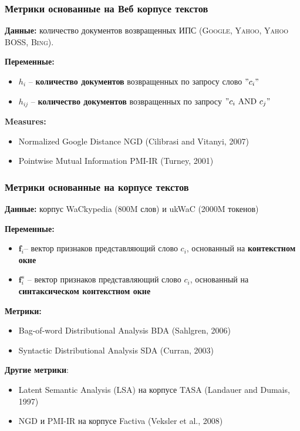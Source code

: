 \documentclass{beamer}
\begin{document}
\begin{frame}
\frametitle{Метрики основанные на Веб корпусе текстов }

\textbf{Данные:} количество документов возвращенных ИПС (\textsc{Google, Yahoo, Yahoo BOSS, Bing}).
	
 \textbf{Переменные:} 
\begin{itemize}
	\item $h_i$ -- \textbf{количество документов} возвращенных по запросу слово $"c_i"$ 
	\item $h_{ij}$ -- \textbf{количество документов} возвращенных по запросу $"c_i \text{ AND } c_j"$
\end{itemize}

\textbf{Measures:} 
\begin{itemize}
\item Normalized Google Distance NGD (Cilibrasi and Vitanyi, 2007)
\item Pointwise Mutual Information PMI-IR (Turney, 2001)
\end{itemize}
\end{frame}

\begin{frame}
\frametitle{Метрики основанные на корпусе текстов}


\textbf{Данные:} корпус WaCkypedia (800M слов) и ukWaC (2000M токенов) 
	
\textbf{Переменные:} 
\begin{itemize}
  \item $\textbf{f}_i$-- вектор признаков представляющий слово $c_i$, основанный на \textbf{контекстном окне}
  \item $ \mathbf{f}^s_i$ -- вектор признаков представляющий слово $c_i$, основанный на \textbf{синтаксическом контекстном окне} 
\end{itemize}
	
\textbf{Метрики:}
\begin{itemize}
	\item Bag-of-word Distributional Analysis BDA (Sahlgren, 2006) 
	\item Syntactic Distributional Analysis SDA (Curran, 2003) 
 \end{itemize}
	
\textbf{Другие метрики}:
\begin{itemize}
\item Latent Semantic Analysis (LSA) на корпусе TASA (Landauer and Dumais, 1997)
\item NGD и PMI-IR на корпусе Factiva (Veksler et al., 2008)
\end{itemize}
	
\end{frame}
\end{document}
